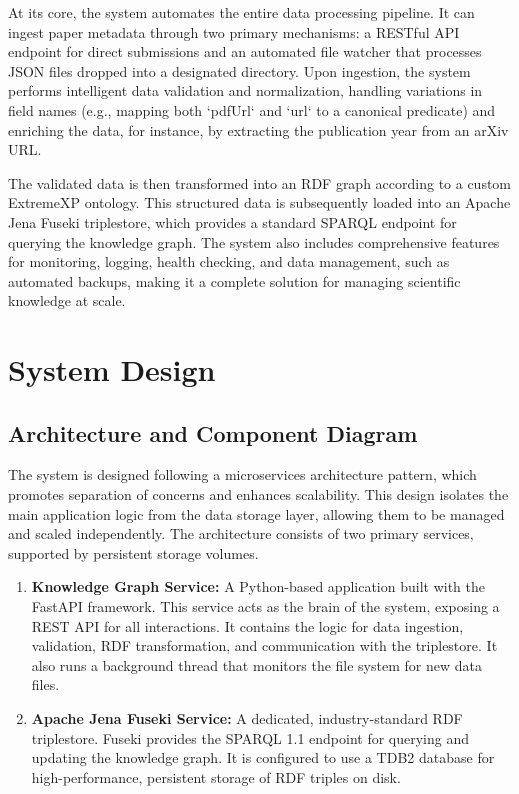 \documentclass[12pt,a4paper]{article}
\begin{document}
At its core, the system automates the entire data processing pipeline. It can ingest paper metadata through two primary mechanisms: a RESTful API endpoint for direct submissions and an automated file watcher that processes JSON files dropped into a designated directory. Upon ingestion, the system performs intelligent data validation and normalization, handling variations in field names (e.g., mapping both `pdfUrl` and `url` to a canonical predicate) and enriching the data, for instance, by extracting the publication year from an arXiv URL.

The validated data is then transformed into an RDF graph according to a custom ExtremeXP ontology. This structured data is subsequently loaded into an Apache Jena Fuseki triplestore, which provides a standard SPARQL endpoint for querying the knowledge graph. The system also includes comprehensive features for monitoring, logging, health checking, and data management, such as automated backups, making it a complete solution for managing scientific knowledge at scale.

\section{System Design}

\subsection{Architecture and Component Diagram}

The system is designed following a microservices architecture pattern, which promotes separation of concerns and enhances scalability. This design isolates the main application logic from the data storage layer, allowing them to be managed and scaled independently. The architecture consists of two primary services, supported by persistent storage volumes.

\begin{enumerate}
    \item \textbf{Knowledge Graph Service:} A Python-based application built with the FastAPI framework. This service acts as the brain of the system, exposing a REST API for all interactions. It contains the logic for data ingestion, validation, RDF transformation, and communication with the triplestore. It also runs a background thread that monitors the file system for new data files.

    \item \textbf{Apache Jena Fuseki Service:} A dedicated, industry-standard RDF triplestore. Fuseki provides the SPARQL 1.1 endpoint for querying and updating the knowledge graph. It is configured to use a TDB2 database for high-performance, persistent storage of RDF triples on disk.
\end{enumerate}
\end{document}
